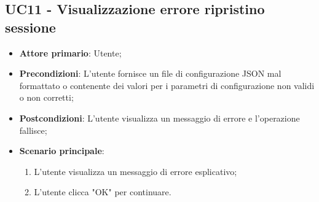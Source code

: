 \subsection{UC11 - Visualizzazione errore ripristino sessione}
\begin{itemize}
	\item \textbf{Attore primario}: Utente;
	\item \textbf{Precondizioni}: L'utente fornisce un file di configurazione JSON mal formattato o contenente dei valori per i parametri di configurazione non validi o non corretti;
	\item \textbf{Postcondizioni}: L'utente visualizza un messaggio di errore e l'operazione fallisce;
	\item \textbf{Scenario principale}:
		\begin{enumerate}
			\item L'utente visualizza un messaggio di errore esplicativo;
			\item L'utente clicca "OK" per continuare.
		\end{enumerate}
\end{itemize}
